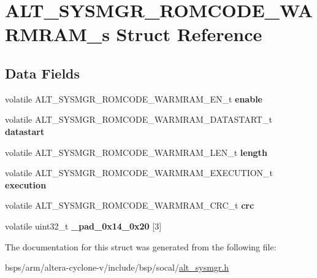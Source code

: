 \hypertarget{structALT__SYSMGR__ROMCODE__WARMRAM__s}{}\section{A\+L\+T\+\_\+\+S\+Y\+S\+M\+G\+R\+\_\+\+R\+O\+M\+C\+O\+D\+E\+\_\+\+W\+A\+R\+M\+R\+A\+M\+\_\+s Struct Reference}
\label{structALT__SYSMGR__ROMCODE__WARMRAM__s}
\subsection*{Data Fields}
\begin{DoxyCompactItemize}
\item 
\mbox{\label{structALT__SYSMGR__ROMCODE__WARMRAM__s_a9aba2033f9a96f9318bce77547dba00e}} 
volatile A\+L\+T\+\_\+\+S\+Y\+S\+M\+G\+R\+\_\+\+R\+O\+M\+C\+O\+D\+E\+\_\+\+W\+A\+R\+M\+R\+A\+M\+\_\+\+E\+N\+\_\+t {\bfseries enable}
\item 
\mbox{\label{structALT__SYSMGR__ROMCODE__WARMRAM__s_ad149cc47b9b74e3bf01726ffc334b734}} 
volatile A\+L\+T\+\_\+\+S\+Y\+S\+M\+G\+R\+\_\+\+R\+O\+M\+C\+O\+D\+E\+\_\+\+W\+A\+R\+M\+R\+A\+M\+\_\+\+D\+A\+T\+A\+S\+T\+A\+R\+T\+\_\+t {\bfseries datastart}
\item 
\mbox{\label{structALT__SYSMGR__ROMCODE__WARMRAM__s_a7f45e6a083809bdfa998495cd9d420d0}} 
volatile A\+L\+T\+\_\+\+S\+Y\+S\+M\+G\+R\+\_\+\+R\+O\+M\+C\+O\+D\+E\+\_\+\+W\+A\+R\+M\+R\+A\+M\+\_\+\+L\+E\+N\+\_\+t {\bfseries length}
\item 
\mbox{\label{structALT__SYSMGR__ROMCODE__WARMRAM__s_ad8107568df2242b1f597b71e75433ad2}} 
volatile A\+L\+T\+\_\+\+S\+Y\+S\+M\+G\+R\+\_\+\+R\+O\+M\+C\+O\+D\+E\+\_\+\+W\+A\+R\+M\+R\+A\+M\+\_\+\+E\+X\+E\+C\+U\+T\+I\+O\+N\+\_\+t {\bfseries execution}
\item 
\mbox{\label{structALT__SYSMGR__ROMCODE__WARMRAM__s_a4dcc03317344f498b1999a59a9b24213}} 
volatile A\+L\+T\+\_\+\+S\+Y\+S\+M\+G\+R\+\_\+\+R\+O\+M\+C\+O\+D\+E\+\_\+\+W\+A\+R\+M\+R\+A\+M\+\_\+\+C\+R\+C\+\_\+t {\bfseries crc}
\item 
\mbox{\label{structALT__SYSMGR__ROMCODE__WARMRAM__s_a263b2d0e9a5cd293089bfd22ebb64b72}} 
volatile uint32\+\_\+t {\bfseries \+\_\+pad\+\_\+0x14\+\_\+0x20} \mbox{[}3\mbox{]}
\end{DoxyCompactItemize}


The documentation for this struct was generated from the following file\+:\begin{DoxyCompactItemize}
\item 
bsps/arm/altera-\/cyclone-\/v/include/bsp/socal/\mbox{\hyperlink{alt__sysmgr_8h}{alt\+\_\+sysmgr.\+h}}\end{DoxyCompactItemize}
